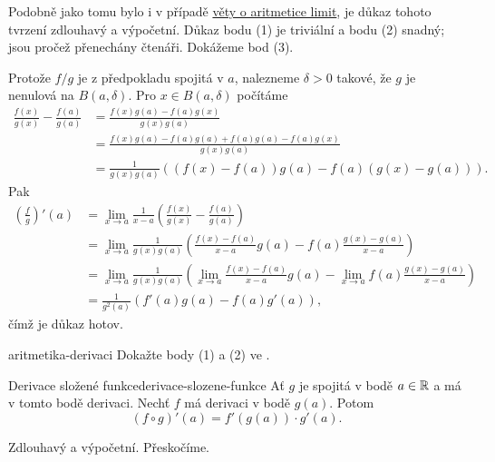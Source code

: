 \begin{thmproof}
 Podobně jako tomu bylo i v případě \hyperref[thm:aritmetika-limit]{věty o
 aritmetice limit}, je důkaz tohoto tvrzení zdlouhavý a výpočetní. Důkaz bodu
 (1) je triviální a bodu (2) snadný; jsou pročež přenechány čtenáři. Dokážeme
 bod (3).

 Protože $f / g$ je z předpokladu spojitá v $a$, nalezneme $\delta>0$ takové, že
 $g$ je nenulová na $B(a,\delta)$. Pro $x \in B(a,\delta)$ počítáme
 \begin{align*}
  \frac{f(x)}{g(x)} - \frac{f(a)}{g(a)} &= \frac{f(x)g(a) -
  f(a)g(x)}{g(x)g(a)}\\
                                        &= \frac{f(x)g(a) - f(a)g(a) + f(a)g(a)
                                        - f(a)g(x)}{g(x)g(a)}\\
                                        &= \frac{1}{g(x)g(a)}\left( (f(x) -
                                        f(a))g(a) - f(a)(g(x) - g(a)) \right).
 \end{align*}
 Pak
 \begin{align*}
  \left( \frac{f}{g} \right)'(a) &= \lim_{x \to a} \frac{1}{x-a}\left(
  \frac{f(x)}{g(x)} - \frac{f(a)}{g(a)} \right)\\
                                 &= \lim_{x \to a} \frac{1}{g(x)g(a)}\left(
                                 \frac{f(x) - f(a)}{x-a}g(a) - f(a) \frac{g(x) -
                                g(a)}{x-a} \right)\\
                                 &= \lim_{x \to a} \frac{1}{g(x)g(a)}\left(
                                 \lim_{x \to a} \frac{f(x) - f(a)}{x-a}g(a) -
                                \lim_{x \to a} f(a) \frac{g(x) - g(a)}{x-a}
                               \right)\\
                                 &= \frac{1}{g^2(a)}\left( f'(a)g(a) - f(a)g'(a)
                                 \right),
 \end{align*}
 čímž je důkaz hotov.
\end{thmproof}

\begin{exercise}{}{aritmetika-derivaci}
 Dokažte body (1) a (2) ve .
\end{exercise}

\begin{theorem}{Derivace složené funkce}{derivace-slozene-funkce}
 Ať $g$ je spojitá v bodě $a \in \mathbb{R}$ a má v tomto bodě derivaci. Nechť $f$ má
 derivaci v bodě $g(a)$. Potom
 \[
  (f \circ g)'(a) = f'(g(a)) \cdot g'(a).
 \]
\end{theorem}
\begin{thmproof}
 Zdlouhavý a výpočetní. Přeskočíme.
\end{thmproof}

